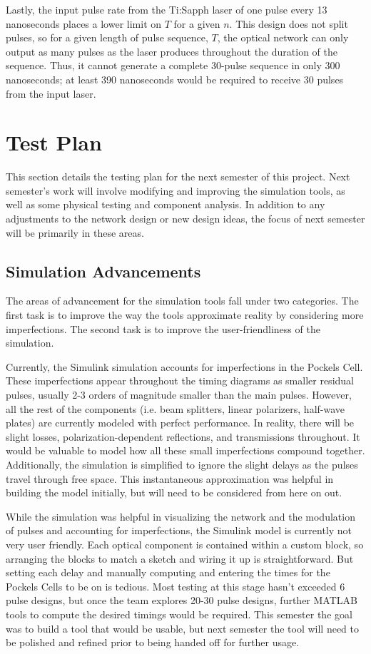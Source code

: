 \documentclass[pdftex,12pt,a4paper]{article}
\begin{document}
Lastly, the input pulse rate from the Ti:Sapph laser of one pulse every 13 nanoseconds places a lower limit on $T$ for a given $n$. This design does not split pulses, so for a given length of pulse sequence, $T$, the optical network can only output as many pulses as the laser produces throughout the duration of the sequence. Thus, it cannot generate a complete 30-pulse sequence in only 300 nanoseconds; at least 390 nanoseconds would be required to receive 30 pulses from the input laser.




\section{Test Plan}
\label{sec:test_plan}
This section details the testing plan for the next semester of this project. Next semester's work will involve modifying and improving the simulation tools, as well as some physical testing and component analysis. In addition to any adjustments to the network design or new design ideas, the focus of next semester will be primarily in these areas. 
\subsection{Simulation Advancements}
\label{sec:simadvance}
The areas of advancement for the simulation tools fall under two categories. The first task is to improve the way the tools approximate reality by considering more imperfections. The second task is to improve the user-friendliness of the simulation. 

Currently, the Simulink simulation accounts for imperfections in the Pockels Cell. These imperfections appear throughout the timing diagrams as smaller residual pulses, usually 2-3 orders of magnitude smaller than the main pulses. However, all the rest of the components (i.e. beam splitters, linear polarizers, half-wave plates) are currently modeled with perfect performance. In reality, there will be slight losses, polarization-dependent reflections, and transmissions throughout. It would be valuable to model how all these small imperfections compound together. Additionally, the simulation is simplified to ignore the slight delays as the pulses travel through free space. This instantaneous approximation was helpful in building the model initially, but will need to be considered from here on out. 

While the simulation was helpful in visualizing the network and the modulation of pulses and accounting for imperfections, the Simulink model is currently not very user friendly. Each optical component is contained within a custom block, so arranging the blocks to match a sketch and wiring it up is straightforward. But setting each delay and manually computing and entering the times for the Pockels Cells to be on is tedious. Most testing at this stage hasn't exceeded 6 pulse designs, but once the team explores 20-30 pulse designs, further MATLAB tools to compute the desired timings would be required. This semester the goal was to build a tool that would be usable, but next semester the tool will need to be polished and refined prior to being handed off for further usage. 
\end{document}
